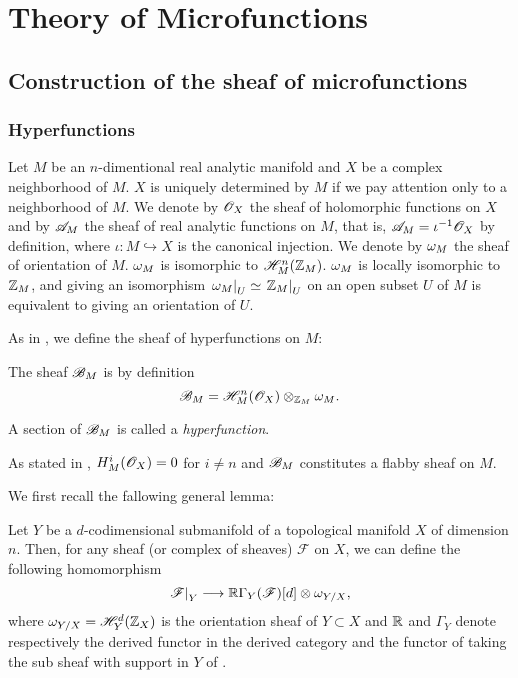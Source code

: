 \chapter{Theory of Microfunctions}

\section{Construction of the sheaf of microfunctions}

\subsection{Hyperfunctions}


Let $M$ be an $n$-dimentional real analytic manifold 
and $X$ be a complex neighborhood of $M$. 
$X$ is uniquely determined by $M$ if we pay attention 
only to a neighborhood of $M$. 
We denote 
by $\mathscr{O}_{X}$ the sheaf of holomorphic functions on $X$ 
and 
by $\mathscr{A}_{M}$ the sheaf of real analytic functions on $M$, 
that is, 
$\mathscr{A}_{M} = \iota^{-1}\mathscr{O}_{X}$ by definition, 
where $\iota \colon M\hookrightarrow X$ is 
the canonical injection.
We denote by $\omega_{M}$ the sheaf of orientation of $M$. 
$\omega_{M}$ is isomorphic to $\mathscr{H}_M^n(\mathbb{Z}_M)$. 
$\omega_{M}$ is locally isomorphic to $\mathbb{Z}_M$, and giving
an isomorphism 
$\left. \omega_{M} \right|_{U}\simeq \left. \mathbb{Z}_M \right|_{U}$ 
on an open subset $U$ of $M$ is equivalent to 
giving an orientation of $U$.

As in \cite{Sato1}, we define the sheaf of hyperfunctions on $M$: 

\begin{dfn}
    The sheaf $\mathscr{B}_{M}$ is by definition 
    \begin{equation}
        \mathscr{B}_{M} = \mathscr{H}_M^n(\mathscr{O}_{X})\otimes_{\mathbb{Z}_{M}}\omega_{M}.
    \end{equation}

    A section of $\mathscr{B}_{M}$ is called a \emph{hyperfunction}.
\end{dfn}

As stated in \cite{Sato1}, $H_M^i(\mathscr{O}_{X}) = 0$ for $i \neq n$ 
and $\mathscr{B}_{M}$ constitutes a flabby sheaf on $M$.

We first recall the fallowing general lemma:

\begin{lem}
    Let $Y$ be a $d$-codimensional submanifold of 
    a topological manifold $X$ of dimension $n$. 
    Then, for any sheaf (or complex of sheaves) $\mathscr{F}$
    on $X$, we can define the following homomorphism
    \begin{equation}
        \left. \mathscr{F} \right|_{Y} \longrightarrow \mathbb{R}\Gamma_Y(\mathscr{F})[d]\otimes\omega_{Y/X},
    \end{equation}
    where $\omega_{Y/X} = \mathscr{H}_Y^d(\mathbb{Z}_X)$ is the orientation sheaf 
    of $Y\subset X$ and $\mathbb{R}$ and $\Gamma_Y$ denote respectively 
    the derived functor in the derived category and 
    the functor of taking the sub sheaf with support 
    in $Y$ of \cite{Hartshorne1}.
\end{lem}


